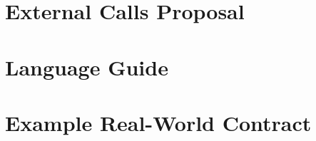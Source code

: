 \documentclass[12pt,twoside]{report}
\begin{document}
\begin{appendices}
\renewcommand\appendixname{Annex}
\renewcommand{\chaptername}{Annex}

\chapter{External Calls Proposal}
\label{chp:appendix-a}


\chapter{Language Guide}
\label{chp:appendix-b}


\chapter{Example Real-World Contract}
\label{chp:appendix-c}

\end{appendices}
\end{document}
